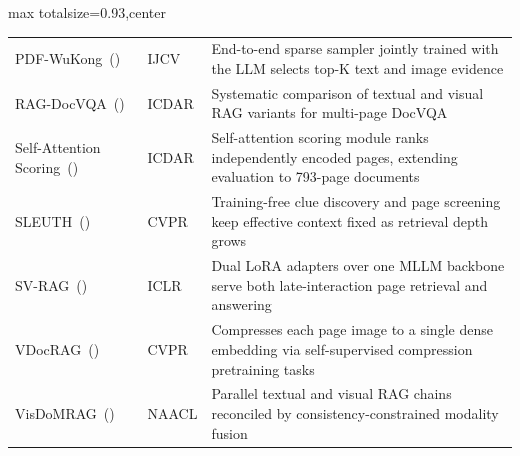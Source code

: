 \begin{table}[p]
\begin{adjustbox}{max totalsize={\textwidth}{0.93\textheight},center}
\begin{tabular}{@{}l l >{\raggedright\arraybackslash}p{}@{}}
  {PDF-WuKong}~(\citeyear{xie2026pdf}) & IJCV & End-to-end sparse sampler jointly trained with the LLM selects top-K text and image evidence \\
  {RAG-DocVQA}~(\citeyear{pez2025enhancing}) & ICDAR & Systematic comparison of textual and visual RAG variants for multi-page DocVQA \\
  {Self-Attention Scoring}~(\citeyear{kang2024multi}) & ICDAR & Self-attention scoring module ranks independently encoded pages, extending evaluation to 793-page documents \\
  {SLEUTH}~(\citeyear{liu2025resolving}) & CVPR & Training-free clue discovery and page screening keep effective context fixed as retrieval depth grows \\
  {SV-RAG}~(\citeyear{chen2025sv}) & ICLR & Dual LoRA adapters over one MLLM backbone serve both late-interaction page retrieval and answering \\
  {VDocRAG}~(\citeyear{tanaka2025vdocrag}) & CVPR & Compresses each page image to a single dense embedding via self-supervised compression pretraining tasks \\
  {VisDoMRAG}~(\citeyear{suri2025visdom}) & NAACL & Parallel textual and visual RAG chains reconciled by consistency-constrained modality fusion \\

\midrule[0.4pt]


\end{tabular}
\end{adjustbox}
\end{table}
